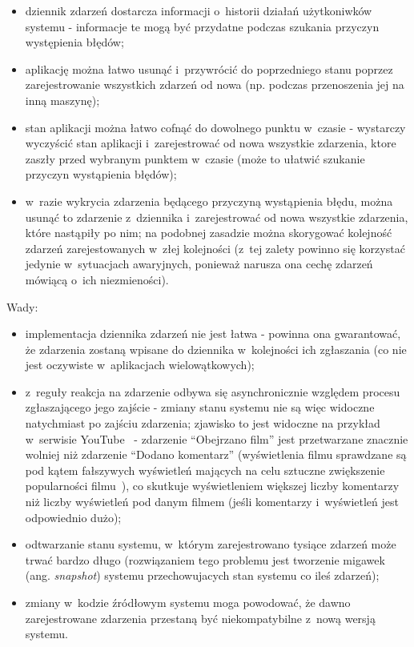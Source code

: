 \begin{itemize}
 \item dziennik zdarzeń dostarcza informacji o~historii działań użytkoniwków systemu - informacje te mogą być przydatne podczas szukania przyczyn występienia błędów;
 \item aplikację można łatwo usunąć i~przywrócić do poprzedniego stanu poprzez zarejestrowanie wszystkich zdarzeń od nowa (np. podczas przenoszenia jej na inną maszynę);
 \item stan aplikacji można łatwo cofnąć do dowolnego punktu w~czasie - wystarczy wyczyścić stan aplikacji i~zarejestrować od nowa wszystkie zdarzenia, ktore zaszły przed wybranym punktem w~czasie (może to ułatwić szukanie przyczyn wystąpienia błędów);
 \item w~razie wykrycia zdarzenia będącego przyczyną wystąpienia błędu, można usunąć to zdarzenie z~dziennika i~zarejestrować od nowa wszystkie zdarzenia, które nastąpiły po nim; na podobnej zasadzie można skorygować kolejność zdarzeń zarejestowanych w~złej kolejności (z~tej zalety powinno się korzystać jedynie w~sytuacjach awaryjnych, ponieważ narusza ona cechę zdarzeń mówiącą o~ich niezmieności).
\end{itemize}

Wady:

\begin{itemize}
 \item implementacja dziennika zdarzeń nie jest łatwa - powinna ona gwarantować, że zdarzenia zostaną wpisane do dziennika w~kolejności ich zgłaszania (co nie jest oczywiste w~aplikacjach wielowątkowych);
 \item z~reguły reakcja na zdarzenie odbywa się asynchronicznie względem procesu zgłaszającego jego zajście - zmiany stanu systemu nie są więc widoczne natychmiast po zajściu zdarzenia; zjawisko to jest widoczne na przykład w~serwisie YouTube~\cite{youtube} - zdarzenie ``Obejrzano film'' jest przetwarzane znacznie wolniej niż zdarzenie ``Dodano komentarz'' (wyświetlenia filmu sprawdzane są pod kątem fałszywych wyświetleń mających na celu sztuczne zwiększenie popularności filmu~\cite{youtube:301}), co skutkuje wyświetleniem większej liczby komentarzy niż liczby wyświetleń pod danym filmem (jeśli komentarzy i~wyświetleń jest odpowiednio dużo);
 \item odtwarzanie stanu systemu, w~którym zarejestrowano tysiące zdarzeń może trwać bardzo długo (rozwiązaniem tego problemu jest tworzenie migawek (ang. \emph{snapshot}) systemu przechowujacych stan systemu co ileś zdarzeń);
 \item zmiany w~kodzie źródłowym systemu moga powodować, że dawno zarejestrowane zdarzenia przestaną być niekompatybilne z~nową wersją systemu.
\end{itemize}


